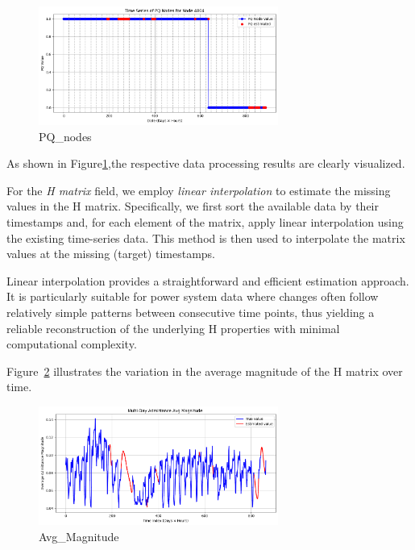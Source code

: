 \documentclass[12pt]{article}
\begin{document}
\begin{figure}[H]
    \centering
    \includegraphics[width=0.7\textwidth]{picture/PQ_nodes.png}
    \caption{PQ\_nodes}
\label{fig:PQ_nodes}
\end{figure}


As shown in Figure\ref{fig:PQ_nodes},the respective data processing results are clearly visualized.

For the \emph{H matrix} field, we employ \emph{linear interpolation} to estimate the missing values in the H matrix. Specifically, we first sort the available data by their timestamps and, for each element of the matrix, apply linear interpolation using the existing time-series data. This method is then used to interpolate the matrix values at the missing (target) timestamps.

Linear interpolation provides a straightforward and efficient estimation approach. It is particularly suitable for power system data where changes often follow relatively simple patterns between consecutive time points, thus yielding a reliable reconstruction of the underlying H properties with minimal computational complexity.

Figure~\ref{fig:Avg_Magnitude} illustrates the variation in the average magnitude of the H matrix over time. 

\begin{figure}[H]
    \centering
    \includegraphics[width=0.7\textwidth]{picture/Avg_Magnitude.png}
    \caption{Avg\_Magnitude}
\label{fig:Avg_Magnitude}
\end{figure}
\end{document}
